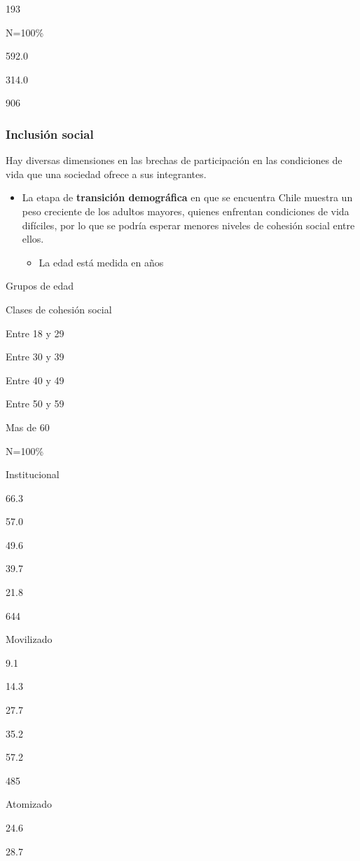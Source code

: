 \documentclass[
  12pt,
]{book}
\providecommand{\tightlist}{%
  \setlength{\itemsep}{0pt}\setlength{\parskip}{0pt}}
\begin{document}
193

N=100\%

592.0

314.0

906

\hypertarget{inclusiuxf3n-social}{%
\subsubsection{Inclusión social}\label{inclusiuxf3n-social}}

Hay diversas dimensiones en las brechas de participación en las condiciones de vida que una sociedad ofrece a sus integrantes.

\begin{itemize}
\tightlist
\item
  La etapa de \textbf{transición demográfica} en que se encuentra Chile muestra un peso creciente de los adultos mayores, quienes enfrentan condiciones de vida difíciles, por lo que se podría esperar menores niveles de cohesión social entre ellos.

  \begin{itemize}
  \tightlist
  \item
    La edad está medida en años
  \end{itemize}
\end{itemize}

Grupos de edad

Clases de cohesión social

Entre 18 y 29

Entre 30 y 39

Entre 40 y 49

Entre 50 y 59

Mas de 60

N=100\%

Institucional

66.3

57.0

49.6

39.7

21.8

644

Movilizado

9.1

14.3

27.7

35.2

57.2

485

Atomizado

24.6

28.7
\end{document}
